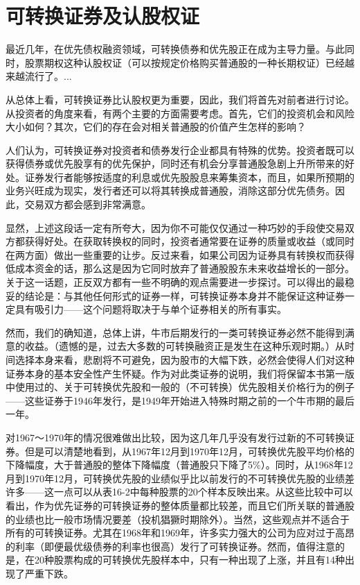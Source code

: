 \documentclass[12pt,oneside]{book}
\begin{document}
\section{可转换证券及认股权证}
最近几年，在优先债权融资领域，可转换债券和优先股正在成为主导力量。与此同时，股票期权这种认股权证（可以按规定价格购买普通股的一种长期权证）已经越来越流行了。...

从总体上看，可转换证券比认股权更为重要，因此，我们将首先对前者进行讨论。从投资者的角度来看，有两个主要的方面需要考虑。首先，它们的投资机会和风险大小如何？其次，它们的存在会对相关普通股的价值产生怎样的影响？

人们认为，可转换证券对投资者和债券发行企业都具有特殊的优势。投资者既可以获得债券或优先股享有的优先保护，同时还有机会分享普通股急剧上升所带来的好处。证券发行者能够按适度的利息或优先股股息来筹集资本，而且，如果所预期的业务兴旺成为现实，发行者还可以将其转换成普通股，消除这部分优先债务。因此，交易双方都会感到非常满意。

显然，上述这段话一定有所夸大，因为你不可能仅仅通过一种巧妙的手段使交易双方都获得好处。在获取转换权的同时，投资者通常要在证券的质量或收益（或同时在两方面）做出一些重要的让步。反过来看，如果公司因为证券具有转换权而获得低成本资金的话，那么这是因为它同时放弃了普通股股东未来收益增长的一部分。关于这一话题，正反双方都有一些不明确的观点需要进一步探讨。可以得出的最稳妥的结论是：与其他任何形式的证券一样，可转换证券本身并不能保证这种证券一定具有吸引力——这个问题将取决于与单个证券相关的所有事实。

然而，我们的确知道，总体上讲，牛市后期发行的一类可转换证券必然不能得到满意的收益。（遗憾的是，过去大多数的可转换融资正是发生在这种乐观时期。）从时间选择本身来看，悲剧将不可避免，因为股市的大幅下跌，必然会使得人们对这种证券本身的基本安全性产生怀疑。作为对此类证券的说明，我们将保留本书第一版中使用过的、关于可转换优先股和一般的（不可转换）优先股相关价格行为的例子——这些证券于1946年发行，是1949年开始进入特殊时期之前的一个牛市期的最后一年。

对1967～1970年的情况很难做出比较，因为这几年几乎没有发行过新的不可转换证券。但是可以清楚地看到，从1967年12月到1970年12月，可转换优先股平均价格的下降幅度，大于普通股的整体下降幅度（普通股只下降了5\%）。同时，从1968年12月到1970年12月，可转换优先股的业绩似乎比以前发行的不可转换优先股的业绩差许多——这一点可以从表16-2中每种股票的20个样本反映出来。从这些比较中可以看出，作为优先证券的可转换证券的整体质量都比较差，而且它们所关联的普通股的业绩也比一般市场情况要差（投机猖獗时期除外）。当然，这些观点并不适合于所有的可转换证券。尤其在1968年和1969年，许多实力强大的公司为应对过于高昂的利率（即便最优级债券的利率也很高）发行了可转换证券。然而，值得注意的是，在20种股票构成的可转换优先股样本中，只有一种出现了上涨，并且有14种出现了严重下跌。
\end{document}
